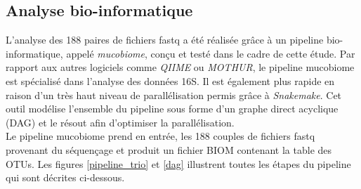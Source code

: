 \documentclass[12pt,a4paper]{article}
\begin{document}
\subsection{Analyse bio-informatique}
L’analyse des 188 paires de fichiers fastq a été réalisée grâce à un pipeline bio-informatique, appelé \textit{mucobiome}, conçu et testé dans le cadre de cette étude. Par rapport aux autres logiciels comme \textit{QIIME}\cite{Caporaso2010} ou \textit{MOTHUR}\cite{Schloss2009}, le pipeline mucobiome est spécialisé dans l’analyse des données 16S. Il est également plus rapide en raison d’un très haut niveau de parallélisation permis grâce à  \textit{Snakemake}\cite{Koster2012}. Cet outil modélise l'ensemble du pipeline sous forme d'un graphe direct acyclique (DAG) et le résout afin d'optimiser la parallélisation. \\
Le pipeline mucobiome prend en entrée, les 188 couples de fichiers fastq provenant du séquençage et produit un fichier BIOM contenant la table des OTUs. Les figures \ref{pipeline_trio} et \ref{dag} illustrent toutes les étapes du pipeline qui sont décrites ci-dessous.
\end{document}
